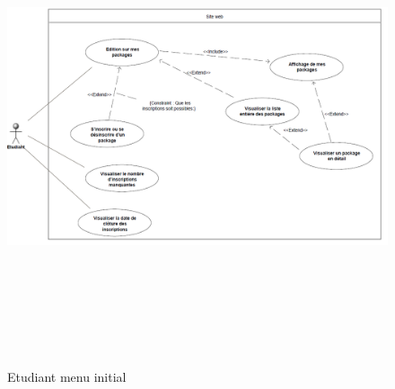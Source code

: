     \begin{figure}[h]
        \begin{center}
            \includegraphics[height=14cm,width=15cm]{images/uml/etudiantMenuInitial.png} 
        \end{center}

        \caption{Etudiant menu initial}
        \label{Etudiant menu initial}
    \end{figure}


